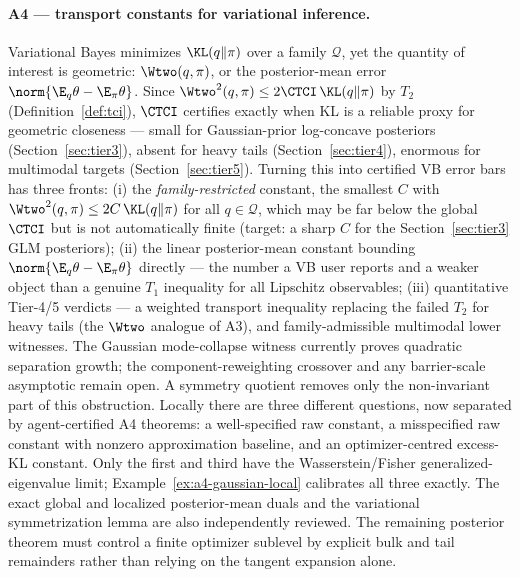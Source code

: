 \documentclass[../main.tex]{subfiles}
\begin{document}
\paragraph{A4 --- transport constants for variational inference.}
Variational Bayes minimizes $\KL(q\|\pi)$ over a family $\mathcal Q$, yet the quantity of interest
is geometric: $\Wtwo(q,\pi)$, or the posterior-mean error $\norm{\E_q\theta-\E_\pi\theta}$. Since
$\Wtwo^2(q,\pi)\le2\CTCI\,\KL(q\|\pi)$ by $T_2$ (Definition~\ref{def:tci}), $\CTCI$ certifies
exactly when KL is a reliable proxy for geometric closeness --- small for Gaussian-prior log-concave
posteriors (Section~\ref{sec:tier3}), absent for heavy tails (Section~\ref{sec:tier4}), enormous for
multimodal targets (Section~\ref{sec:tier5}). Turning this into certified VB error bars has three
fronts: (i) the \emph{family-restricted} constant, the smallest $C$ with
$\Wtwo^2(q,\pi)\le2C\,\KL(q\|\pi)$ for all $q\in\mathcal Q$, which may be far below the
global $\CTCI$ but is not automatically finite (target: a sharp $C$
for the Section~\ref{sec:tier3} GLM posteriors); (ii) the linear posterior-mean constant bounding
$\norm{\E_q\theta-\E_\pi\theta}$ directly --- the number a VB user reports and a weaker object
than a genuine $T_1$ inequality for all Lipschitz observables; (iii) quantitative Tier-4/5 verdicts --- a weighted transport
inequality replacing the failed $T_2$ for heavy tails (the $\Wtwo$ analogue of A3), and
family-admissible multimodal lower witnesses. The Gaussian mode-collapse witness currently proves
quadratic separation growth; the component-reweighting crossover and any barrier-scale asymptotic
remain open. A symmetry quotient removes only the non-invariant part of this obstruction.
Locally there are three different questions, now separated by agent-certified A4 theorems: a
well-specified raw constant, a misspecified raw constant with nonzero approximation baseline, and
an optimizer-centred excess-KL constant. Only the first and third have the Wasserstein/Fisher
generalized-eigenvalue limit; Example~\ref{ex:a4-gaussian-local} calibrates all three exactly.
The exact global and localized posterior-mean duals and the variational symmetrization lemma are
also independently reviewed.
The remaining posterior theorem must control a finite optimizer sublevel by explicit bulk and
tail remainders rather than relying on the tangent expansion alone.
\end{document}
